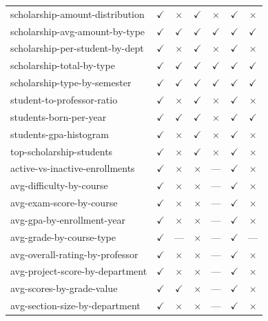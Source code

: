 \begin{longtable}{lcccccc}
scholarship-amount-distribution & $\checkmark$ & $\times$ & $\checkmark$ & $\times$ & $\checkmark$ & $\times$ \\
scholarship-avg-amount-by-type & $\checkmark$ & $\checkmark$ & $\checkmark$ & $\checkmark$ & $\checkmark$ & $\checkmark$ \\
scholarship-per-student-by-dept & $\checkmark$ & $\times$ & $\checkmark$ & $\times$ & $\checkmark$ & $\times$ \\
scholarship-total-by-type & $\checkmark$ & $\checkmark$ & $\checkmark$ & $\checkmark$ & $\checkmark$ & $\checkmark$ \\
scholarship-type-by-semester & $\checkmark$ & $\checkmark$ & $\checkmark$ & $\checkmark$ & $\checkmark$ & $\checkmark$ \\
student-to-professor-ratio & $\checkmark$ & $\times$ & $\checkmark$ & $\times$ & $\checkmark$ & $\times$ \\
students-born-per-year & $\checkmark$ & $\checkmark$ & $\checkmark$ & $\times$ & $\checkmark$ & $\checkmark$ \\
students-gpa-histogram & $\checkmark$ & $\times$ & $\checkmark$ & $\times$ & $\checkmark$ & $\times$ \\
top-scholarship-students & $\checkmark$ & $\times$ & $\checkmark$ & $\times$ & $\checkmark$ & $\times$ \\
active-vs-inactive-enrollments & $\checkmark$ & $\times$ & $\times$ & --- & $\checkmark$ & $\times$ \\
avg-difficulty-by-course & $\checkmark$ & $\times$ & $\times$ & --- & $\checkmark$ & $\times$ \\
avg-exam-score-by-course & $\checkmark$ & $\times$ & $\times$ & --- & $\checkmark$ & $\times$ \\
avg-gpa-by-enrollment-year & $\checkmark$ & $\times$ & $\times$ & --- & $\checkmark$ & $\times$ \\
avg-grade-by-course-type & $\checkmark$ & --- & $\times$ & --- & $\checkmark$ & --- \\
avg-overall-rating-by-professor & $\checkmark$ & $\times$ & $\times$ & --- & $\checkmark$ & $\times$ \\
avg-project-score-by-department & $\checkmark$ & $\times$ & $\times$ & --- & $\checkmark$ & $\times$ \\
avg-scores-by-grade-value & $\checkmark$ & $\checkmark$ & $\times$ & --- & $\checkmark$ & $\times$ \\
avg-section-size-by-department & $\checkmark$ & $\times$ & $\times$ & --- & $\checkmark$ & $\times$ \\

\end{longtable}
